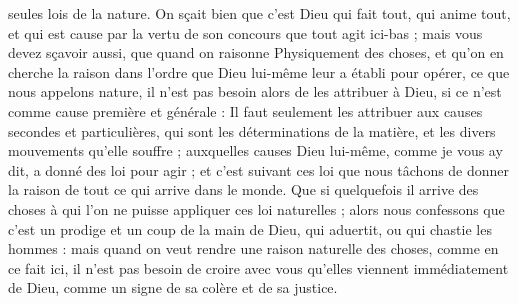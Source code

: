 \documentclass[a4paper, 11pt, oneside, polutonikogreek, french]{article}
\begin{document}
seules lois de la nature. On sçait bien que c'est Dieu qui fait tout, qui anime tout, et qui est cause par la vertu de son concours que tout agit ici-bas ; mais vous devez sçavoir aussi, que quand on raisonne Physiquement des choses, et qu'on en cherche la raison dans l'ordre que Dieu lui-même leur a établi pour opérer, ce que nous appelons nature, il n'est pas besoin alors de les attribuer à Dieu, si ce n'est comme cause première et générale : Il faut seulement les attribuer aux causes secondes et particulières, qui sont les déterminations de la matière, et les divers mouvements qu'elle souffre ; auxquelles causes Dieu lui-même, comme je vous ay dit, a donné des loi pour agir ; et c'est suivant ces loi que nous tâchons de donner la raison de tout ce qui arrive dans le monde. Que si quelquefois il arrive des choses à qui l'on ne puisse appliquer ces loi naturelles ; alors nous confessons que c'est un prodige et un coup de la main de Dieu, qui aduertit, ou qui chastie les hommes : mais quand on veut rendre une raison naturelle des choses, comme en ce fait ici, il n'est pas besoin de croire avec vous qu'elles viennent immédiatement de Dieu, comme un signe de sa colère et de sa justice.
\clearpage
\end{document}
